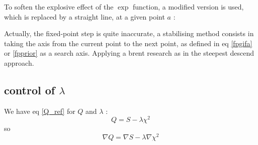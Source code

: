 \documentclass[]{article}
\begin{document}
To soften the explosive effect of the $\exp$ function, a modified version is used, which is replaced by a straight line, at a given point $a$ :

Actually, the fixed-point step is quite inaccurate, a stabilising method consists in taking the axis from the current point to the next point, as defined in eq \ref{fpgifa} or \ref{fpprior} as a search axis.
Applying a brent research as in the steepest descend approach.

\subsection{control of $\lambda$} %
We have eq \ref{Q_ref} for $Q$ and $\lambda$ :
\begin{equation}
    Q = S - \lambda \chi^2
\end{equation}
so
\begin{equation}
    \nabla{Q} = \nabla{S} - \lambda \nabla{\chi^2}
\end{equation}
\end{document}
